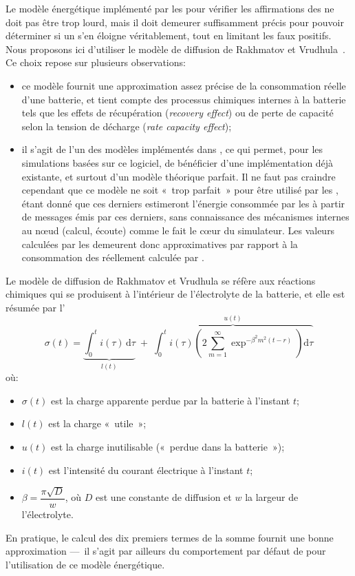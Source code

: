 Le modèle énergétique implémenté par les \vns pour vérifier les affirmations des \cns ne doit pas être trop lourd, mais il doit demeurer suffisamment précis pour pouvoir déterminer si un \cn s'en éloigne véritablement, tout en limitant les faux positifs.
Nous proposons ici d'utiliser le modèle de diffusion de Rakhmatov et Vrudhula~\cite{RV01}.\label{se:rakvru-formula}
Ce choix repose sur plusieurs observations:
\begin{itemize}
    \item ce modèle fournit une approximation assez précise de la consommation réelle d'une batterie, et tient compte des processus chimiques internes à la batterie tels que les effets de récupération (\textit{recovery effect}) ou de perte de capacité selon la tension de décharge (\textit{rate capacity effect});
    \item il s'agit de l'un des modèles implémentés dans \nsiii, ce qui permet, pour les simulations basées sur ce logiciel, de bénéficier d'une implémentation déjà existante, et surtout d'un modèle théorique parfait. Il ne faut pas craindre cependant que ce modèle ne soit « trop parfait » pour être utilisé par les \vns, étant donné que ces derniers estimeront l'énergie consommée par les \cns à partir de messages émis par ces derniers, sans connaissance des mécanismes internes au nœud (calcul, écoute) comme le fait le cœur du simulateur. Les valeurs calculées par les \vns demeurent donc approximatives par rapport à la consommation des \cns réellement calculée par \nsiii.
\end{itemize}
Le modèle de diffusion de Rakhmatov et Vrudhula se réfère aux réactions chimiques qui se produisent à l'intérieur de l'électrolyte de la batterie, et elle est résumée par l'
\begin{equation}
    \label{se:eqn:rvdm}
    \sigma(t) = \underbrace{\int_{0}^{t} i(\tau) \, \mathrm d\tau}_{l(t)} \;+\; \overbrace{\int_{0}^{t} i(\tau) \left(2 \sum_{m=1}^{\infty} \exp^{-\beta^2 m^2 (t-r)} \right) \mathrm d\tau}^{u(t)}
\end{equation}
où:
\begin{itemize}
    \item $\sigma(t)$ est la charge apparente perdue par la batterie à l'instant $t$;
    \item $l(t)$ est la charge « utile »;
    \item $u(t)$ est la charge inutilisable (« perdue dans la batterie »);
    \item $i(t)$ est l'intensité du courant électrique à l'instant $t$;
    \item $\beta = \dfrac{\pi\sqrt{D}}{w}$, où $D$ est une constante de diffusion et $w$ la largeur de l'électrolyte.
\end{itemize}
En pratique, le calcul des dix premiers termes de la somme fournit une bonne approximation ---~il s'agit par ailleurs du comportement par défaut de \nsiii pour l'utilisation de ce modèle énergétique.

